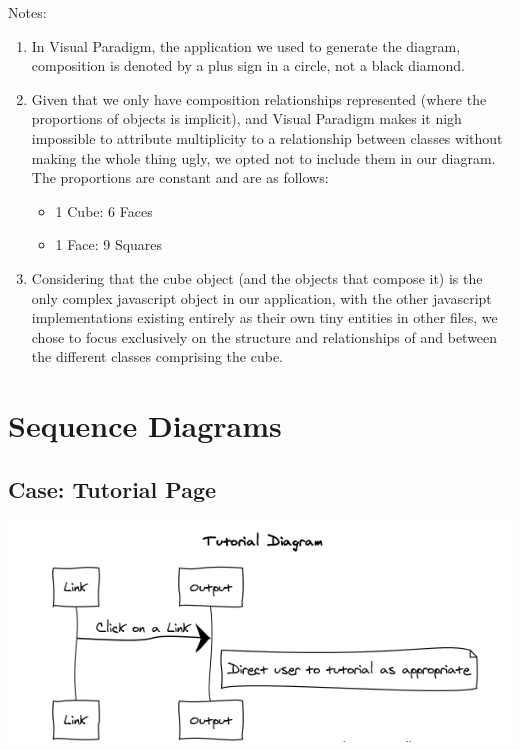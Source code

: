 \documentclass[12pt]{article}
\begin{document}
	\par Notes: \\
	
	\begin{enumerate}
	\item In Visual Paradigm, the application we used to generate the diagram, composition is denoted by a plus sign in a circle, not a black diamond.
	\item Given that we only have composition relationships represented (where the proportions of objects is implicit), and Visual Paradigm makes it nigh impossible to attribute multiplicity to a relationship between classes without making the whole thing ugly, we opted not to include them in our diagram. The proportions are constant and are as follows:
	\begin{itemize}
	\item 1 Cube: 6 Faces
	\item 1 Face: 9 Squares
	\end{itemize}
	\item Considering that the cube object (and the objects that compose it) is the only complex javascript object in our application, with the other javascript implementations existing entirely as their own tiny entities in other files, we chose to focus exclusively on the structure and relationships of and between the different classes comprising the cube.
	\end{enumerate}
	

\section{Sequence Diagrams}
	\subsection{Case: Tutorial Page}
	\includegraphics[width = .5\textwidth]{tut.PNG}
\end{document}
